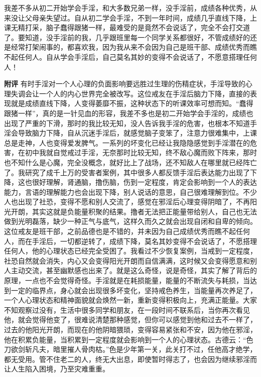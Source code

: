 \begin{case}
    我差不多从初二开始学会手淫，和大多数兄弟一样，没手淫前，成绩各种优秀，从来没让父母亲失望过。自从初二学会手淫，不到一年时间，成绩几乎直线下降，上课无精打采，脑子蠢得跟猪一样，最难受的是竟然不会说话了，完全不会打交道了。要知道，没手淫前的我，几乎跟班里每一个同学关系都很好，不管成绩好的还是经常打架闹事的，都喜欢我，因为我从来不会因为自己是班干部、成绩优秀而瞧不起任何人。自从学会手淫后，自己莫名其妙的变得不会说话了，不愿意搭理任何人！

    \textbf{附评} 有时手淫对一个人心理的负面影响要远胜过生理的伤精症状，手淫导致的心理失调会让一个人的内心世界完全被改写。这位戒友在手淫后脑力下降，直接的表现就是成绩直线下降，人变得萎靡不振，这种状态下的听课效率可想而知。“蠢得跟猪一样”，真的是一针见血的形容，我差不多也是初二开始学会手淫的，成绩也出现了严重的下滑，那时的我比较无知，没人告诉我手淫的危害，也根本不知道手淫会导致脑力下降，自从沉迷手淫后，就感觉脑子变笨了，注意力很难集中，上课总是走神，人也变得爱发脾气。一系列的坏变化已经让我隐隐感觉到手淫潜在的危害，在初中我就自觉戒过手淫，无奈那时比较无知，终不敌心魔而败下阵来，那时也不知什么是心魔，完全没概念，就好比上了战场，还不知敌人在哪里就已经阵亡了。我研究了成千上万的受害者案例，其中很多人都反馈手淫后表达能力出现了下降，这也很好理解，肾通脑，撸伤脑，伤到一定程度，肯定会影响到一个人的表达能力，言语的理解能力也会出现下降，别人说话的意思，自己很难理解到位。不少人也出现了社恐，变得不愿和别人交流了，感觉在邪淫后心理变得阴暗了，不再阳光开朗，其实这就是负能量积聚的结果。撸者无法把正能量带给别人，自己也无法做到光明磊落，缺少一种正气与底气，这样久而久之就会出现自闭和自卑的倾向。这位戒友是班干部，之前品德也是不错的，并未因为自己成绩优秀而瞧不起任何人，而在手淫后，一切都逆转了，成绩下降，莫名其妙变得不会说话了，不愿搭理任何人，他的心理状态已经完全受困了。我看过不少恢复案例，当戒到一定程度，社恐自然就会消失，内心又会变得阳光开朗而自信满满，这时候又会变得愿意和别人主动交流，甚至幽默感也出来了。就是这么奇怪，说是奇怪，其实了解了背后的原理，一点也不会觉得奇怪。手淫就是在耗损能量，能量的不断流失与耗损，当达到一定的临界点，身心就会出现很多坏变化，坚持戒色养生，当能量再次养足了，一个人心理状态和精神面貌就会焕然一新，重新变得积极向上，充满正能量。大家不知观察过没有，生活中很多同学和朋友，在一段时间不联系后，当你再次看见他，就会觉得他变了，很难说清楚那种感觉，但你可以感觉到他和过去不一样了，过去的他阳光开朗，而现在的他阴暗猥琐，变得容易紧张和不安，因为他在邪淫，他在积累负能量，当积累到一定程度就会影响到一个人的心理状态。古德云：“色刀欲剑斩凡夫，暗里摧人骨肉枯。”色是少年第一关，此关打不过，任他高才绝学，都无受用。管不住老二的人，终无大出息，即使暂时得志了，也会因为继续邪淫而让人生陷入困境，乃至灾难重重。
\end{case}

